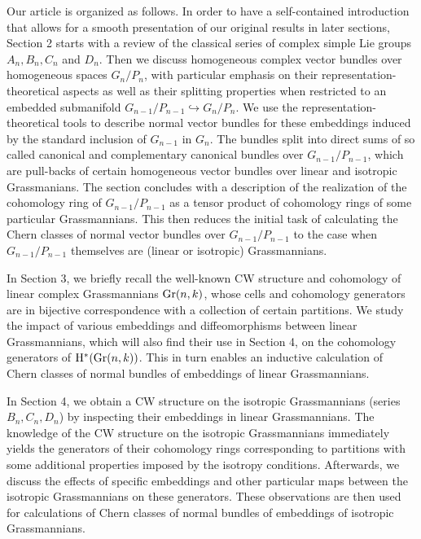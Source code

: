 Our article is organized as follows. In order to have a self-contained introduction that allows for a
smooth presentation of our original results in later sections, Section 2 starts with a review of the
classical series of complex simple Lie groups $A_{n}, B_{n}, C_{n}$ and $D_{n}$. Then we discuss 
homogeneous complex vector bundles over homogeneous spaces $G_{n}/P_n$, with particular emphasis 
on their representation-theoretical aspects as well as their splitting properties when restricted 
to an embedded submanifold $G_{n-1}/P_{n-1} \hookrightarrow G_{n}/P_{n}$. We use the representation-theoretical tools to describe normal vector bundles for these embeddings induced by the standard 
inclusion of 
$G_{n-1}$ in $G_{n}$. The bundles split into direct sums of so called canonical 
and complementary canonical bundles over $G_{n-1}/P_{n-1}$, which are pull-backs of certain
homogeneous vector bundles over linear and isotropic Grassmanians.
The section concludes with a description of the realization of the cohomology ring of $G_{n-1}/P_{n-1}$ 
as a tensor product of cohomology rings of some particular Grassmannians. This then reduces the initial task 
of calculating the Chern classes of normal vector bundles over $G_{n-1}/P_{n-1}$ to 
the case when $G_{n-1}/P_{n-1}$ themselves are (linear or isotropic) Grassmannians. 

In Section 3, we briefly recall the well-known CW structure and cohomology of linear complex 
Grassmannians $\mathrm{Gr}(n, k)$, whose cells and cohomology generators are in bijective correspondence 
with a collection of certain partitions. We study the impact of various embeddings and diffeomorphisms 
between linear Grassmannians, which will also find their use in Section 4, on the cohomology generators 
of $\mathrm{H}^{*}(\mathrm{Gr}(n, k))$. This in turn enables an
inductive calculation of Chern classes of normal bundles of embeddings of linear Grassmannians.

In Section 4, we obtain a CW structure on the isotropic Grassmannians (series $B_{n}, C_{n}, D_{n}$) by inspecting their embeddings in linear Grassmannians. The knowledge of the CW structure on the isotropic 
Grassmannians immediately yields the generators of their cohomology rings corresponding to partitions 
with some additional properties imposed by the isotropy conditions. Afterwards, we discuss the effects 
of specific embeddings and other particular maps between the isotropic Grassmannians on these generators. These observations 
are then used for calculations of Chern classes of normal bundles of embeddings of isotropic 
Grassmannians.